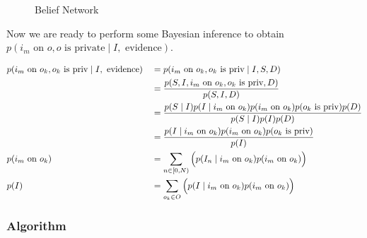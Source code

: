\documentclass[11pt]{article}
\begin{document}
\begin{figure}[ht]
\centering
    \caption{Belief Network}\label{fig:belief}
\end{figure}

Now we are ready to perform some Bayesian inference to obtain $p(i_m \textrm{ on } o, o \textrm{ is private} \mid I, \textrm{ evidence})$.

\begin{align}
    & p(i_m \textrm{ on } o_k, o_k \textrm{ is priv} \mid I, \textrm{ evidence})     && = p(i_m \textrm{ on } o_k, o_k \textrm{ is priv} \mid I, S, D) \notag\\
    & \quad && = \frac
        {p(S, I, i_m \textrm{ on } o_k, o_k \textrm{ is priv}, D)}
        {p(S, I, D)} \notag\\
    & \quad && = \frac
        {p(S \mid I) p(I \mid i_m \textrm{ on } o_k) p(i_m \textrm{ on } o_k) p(o_k \textrm{ is priv}) p(D)}
        {p(S \mid I) p(I) p(D)} \notag\\
    & \quad && = \frac
        {p(I \mid i_m \textrm{ on } o_k) p(i_m \textrm{ on } o_k) p(o_k \textrm{ is priv})}
        {p(I)}\\
    & p(i_m \textrm{ on } o_k) 
        && = \sum\limits_{n \in \lbrack0,N)} \Big( p(I_n \mid i_m \textrm{ on } o_k) p(i_m \textrm{ on } o_k) \Big) \label{eqn:joint}\\
    & p(I)
        && = \sum\limits_{o_k \in O} \Big( p(I \mid i_m \textrm{ on } o_k) p(i_m \textrm{ on } o_k) \Big)%
\end{align}%

\subsubsection{Algorithm}
\end{document}
